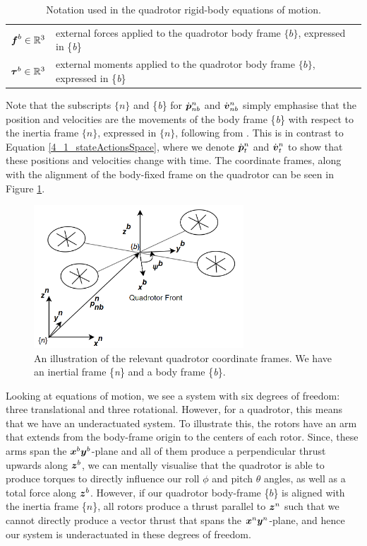 \begin{table}[h]
\begin{tabular}{ll}
        $\boldsymbol{f}^b \in \mathbb{R}^3$             & external forces applied to the quadrotor body frame $\{b\}$, expressed in \{\textit{b}\} \vspace{0.8mm} \\
        
        $\boldsymbol{\tau}^b \in \mathbb{R}^3$          & external moments applied to the quadrotor body frame $\{b\}$, expressed in \{\textit{b}\}
    \end{tabular}
    \caption{Notation used in the quadrotor rigid-body equations of motion.}
    \label{table:parameters}
\end{table}

Note that the subscripts $\{n\}$ and \{\textit{b}\} for $\Dot{{\boldsymbol{p}}}^n_{nb}$ and $\Dot{{\boldsymbol{v}}}^n_{nb}$ simply emphasise that the position and velocities are the movements of the body frame \{\textit{b}\} with respect to the inertia frame $\{n\}$, expressed in $\{n\}$, following from \cite{Fossen2021}. This is in contrast to Equation \eqref{4_1_stateActionsSpace}, where we denote $\Dot{{\boldsymbol{p}}}^n_t$ and $\Dot{{\boldsymbol{v}}}^n_t$ to show that these positions and velocities change with time.
The coordinate frames, along with the alignment of the body-fixed frame on the quadrotor can be seen in Figure \ref{fig:4_1_quadrotorBody}.
\begin{figure}[hbt]
    \centering
    \includegraphics[width=0.7\textwidth]{figures/4_/4_2_quadrotorBody.png}
    \caption{An illustration of the relevant quadrotor coordinate frames. We have an inertial frame \{\textit{n}\} and a body frame \{\textit{b}\}.}
    \label{fig:4_1_quadrotorBody}
\end{figure}

Looking at equations of motion, we see a system with six degrees of freedom: three translational and three rotational. 
However, for a quadrotor, this means that we have an underactuated system. To illustrate this, the rotors have an arm that extends from the body-frame origin to the centers of each rotor. Since, these arms span the ${\boldsymbol{x}}^b{\boldsymbol{y}}^b$-plane and all of them produce a perpendicular thrust upwards along ${\boldsymbol{z}}^b$, we can mentally visualise that the quadrotor is able to produce torques to directly influence our roll $\phi$ and pitch $\theta$ angles, as well as a total force along ${\boldsymbol{z}}^b$. However, if our quadrotor body-frame \{$b$\} is aligned with the inertia frame \{$n$\}, all rotors produce a thrust parallel to ${\boldsymbol{z}}^n$ such that we cannot directly produce a vector thrust that spans the ${\boldsymbol{x}}^n{\boldsymbol{y}}^n$-plane, and hence our system is underactuated in these degrees of freedom. 

